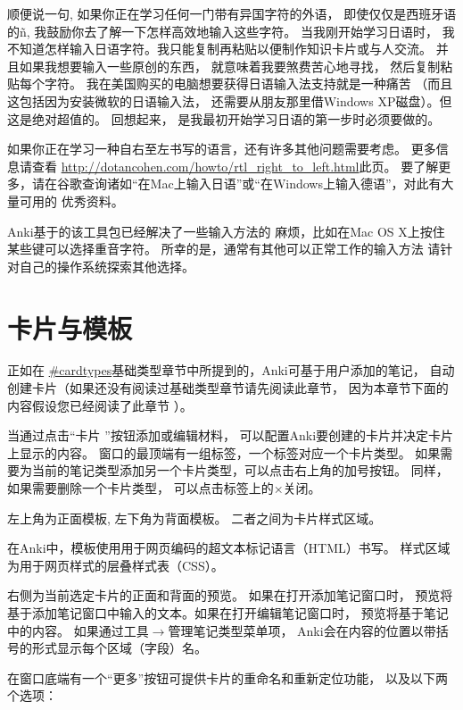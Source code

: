 \documentclass[a4paper]{book}
\begin{document}
	\begin{fquote}
顺便说一句, 如果你正在学习任何一门带有异国字符的外语， 即使仅仅是西班牙语的ñ, 我鼓励你去了解一下怎样高效地输入这些字符。 当我刚开始学习日语时， 我不知道怎样输入日语字符。我只能复制再粘贴以便制作知识卡片或与人交流。 并且如果我想要输入一些原创的东西， 就意味着我要煞费苦心地寻找， 然后复制粘贴每个字符。 我在美国购买的电脑想要获得日语输入法支持就是一种痛苦 （而且这包括因为安装微软的日语输入法， 还需要从朋友那里借Windows XP磁盘）。但这是绝对超值的。
回想起来， 是我最初开始学习日语的第一步时必须要做的。
	\end{fquote}

	如果你正在学习一种自右至左书写的语言，还有许多其他问题需要考虑。 更多信息请查看
	\url{http://dotancohen.com/howto/rtl_right_to_left.html}此页。
	要了解更多，请在谷歌查询诸如“在Mac上输入日语”或“在Windows上输入德语”，对此有大量可用的 优秀资料。
	
	\begin{shaded}
		Anki基于的该工具包已经解决了一些输入方法的 麻烦，比如在Mac OS X上按住某些键可以选择重音字符。 所幸的是，通常有其他可以正常工作的输入方法 请针对自己的操作系统探索其他选择。
	\end{shaded}
	
	\chapter{卡片与模板}\label{}
	
	正如在 \url{#cardtypes}基础类型章节中所提到的，Anki可基于用户添加的笔记， 自动创建卡片（如果还没有阅读过基础类型章节请先阅读此章节， 因为本章节下面的内容假设您已经阅读了此章节 ）。
	
当通过点击“卡片
	”按钮添加或编辑材料， 可以配置Anki要创建的卡片并决定卡片上显示的内容。 窗口的最顶端有一组标签，一个标签对应一个卡片类型。 如果需要为当前的笔记类型添加另一个卡片类型，可以点击右上角的加号按钮。 同样，如果需要删除一个卡片类型， 可以点击标签上的×关闭。
	
	左上角为正面模板, 左下角为背面模板。 二者之间为卡片样式区域。
	
	在Anki中，模板使用用于网页编码的超文本标记语言（HTML）书写。 样式区域为用于网页样式的层叠样式表（CSS）。
	
	右侧为当前选定卡片的正面和背面的预览。 如果在打开添加笔记窗口时， 预览将基于添加笔记窗口中输入的文本。如果在打开编辑笔记窗口时， 预览将基于笔记中的内容。 如果通过工具$\to$管理笔记类型菜单项， Anki会在内容的位置以带括号的形式显示每个区域（字段）名。
	
	在窗口底端有一个“更多”按钮可提供卡片的重命名和重新定位功能， 以及以下两个选项：
	
\end{document}
